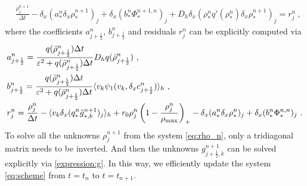 \documentclass[review,onefignum,onetabnum]{siamart220329}
\newcommand {\e}  {\varepsilon}
\begin{document}
\begin{align} 
    &\frac{\rho_j^{n+1}}{\Delta t} 
    - \delta_x(a_*^n \delta_x \rho_*^{n+1})_j 
    + \delta_x(b_*^n\Phi^{n+1,n}_*)_j + D_h \delta_x(\rho_*^n q'(\rho_*^n)\delta_x \rho_*^{n+1})_j =  r_j^n\ ,
    \label{eq:rho_n}
\end{align}
where the coefficients $a_{j+\frac12}^n$, $b_{j+\frac12}^n$ and residuals $r_j^n$ can be explicitly computed via 
\begin{subequations}
\begin{align*}
    & a_{j+\frac12}^n %
    = \frac{q(\bar{\rho}_{j+\frac12}^n)\Delta t}{\e^2 + q(\bar{\rho}_{j+\frac12}^n)\Delta t} D_h q(\bar{\rho}_{j+\frac12}^n)\ , \\
    & b_{j+\frac12}^n = \frac{q(\bar{\rho}_{j+\frac12}^n)\Delta t}{\e^2 + q(\bar{\rho}_{j+\frac12}^n)\Delta t} \langle v_k\psi_{1}(v_k,\delta_x c_{j+\frac12}^n)\rangle_h\ , \\
    & r_j^n = \frac{\rho_j^n}{\Delta t} - \langle v_k\delta_x (q_*^n \tilde{g}_{*,k}^{n+1})_j\rangle_h + r_0 \rho_j^n\left(1 - \frac{\rho_j^n}{\rho_{\rm max}}\right)_+ - \delta_x(a_*^n \delta_x \rho_*^n)_j
    + \delta_x(b_*^n\Phi_*^{n,n})_j\ .%
\end{align*}
\end{subequations}
To solve all the unknowns $\rho_j^{n+1}$ from the system \cref{eq:rho_n}, only a tridiagonal matrix needs to be inverted. 
And then the unknowns $g_{j+\frac12,k}^{n+1}$ can be solved explicitly via \cref{expression:g}. 
In this way, we efficiently update the system \cref{eq:scheme} from $t=t_n$ to $t=t_{n+1}$. 
\end{document}
